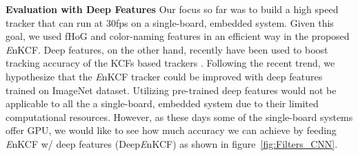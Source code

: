 \documentclass[10pt,twocolumn,letterpaper]{article}
\begin{document}
\textbf{Evaluation with Deep Features} Our focus so far was to build a
high speed tracker that can run at 30fps on a single-board, embedded
system. Given this goal, we used fHoG and color-naming features in an
efficient way in the proposed {\it E}nKCF. Deep features, on the
other hand, recently have been used to boost tracking accuracy of the
KCFs based trackers \cite{ma2015hierarchical,
  danelljan2015convolutional}. Following the recent trend, we hypothesize 
that the {\it E}nKCF tracker could be improved with deep features trained on ImageNet
dataset. Utilizing pre-trained deep features would not be applicable to
all the a single-board, embedded system due to their limited
computational resources. However, as these days some of the single-board
systems offer GPU, we would like to see how much accuracy we can
achieve by feeding {\it E}nKCF w/ deep features (Deep{\it E}nKCF) as shown in figure~\ref{fig:Filters_CNN}.
\end{document}
